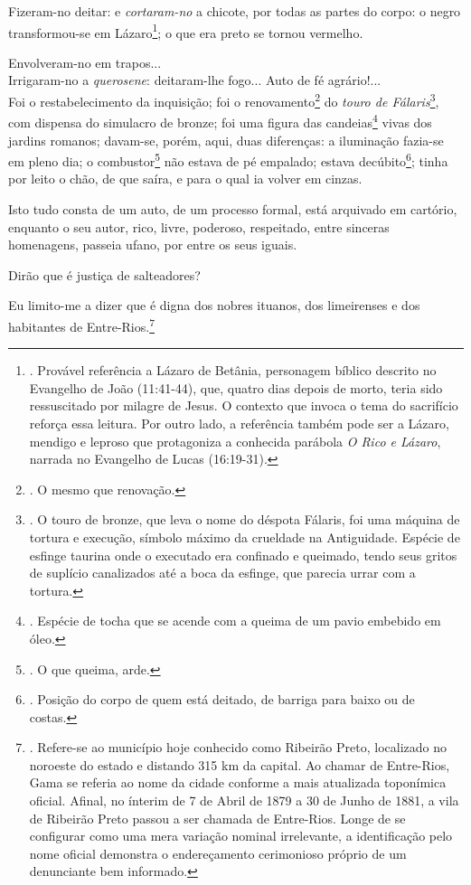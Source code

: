 Fizeram-no deitar: e \emph{cortaram-no} a chicote, por todas as partes
do corpo: o negro transformou-se em Lázaro\footnote{. Provável
  referência a Lázaro de Betânia, personagem bíblico descrito no
  Evangelho de João (11:41-44), que, quatro dias depois de morto, teria
  sido ressuscitado por milagre de Jesus. O contexto que invoca o tema
  do sacrifício reforça essa leitura. Por outro lado, a referência
  também pode ser a Lázaro, mendigo e leproso que protagoniza a
  conhecida parábola \emph{O Rico e Lázaro}, narrada no Evangelho de
  Lucas (16:19-31).}; o que era preto se tornou vermelho.

Envolveram-no em trapos...\\
Irrigaram-no a \emph{querosene}: deitaram-lhe fogo... Auto de fé
agrário!...\\
Foi o restabelecimento da inquisição; foi o renovamento\footnote{. O
  mesmo que renovação.} do \emph{touro de Fálaris}\footnote{. O touro de
  bronze, que leva o nome do déspota Fálaris, foi uma máquina de tortura
  e execução, símbolo máximo da crueldade na Antiguidade. Espécie de
  esfinge taurina onde o executado era confinado e queimado, tendo seus
  gritos de suplício canalizados até a boca da esfinge, que parecia
  urrar com a tortura.}, com dispensa do simulacro de bronze; foi uma
figura das candeias\footnote{. Espécie de tocha que se acende com a
  queima de um pavio embebido em óleo.} vivas dos jardins romanos;
davam-se, porém, aqui, duas diferenças: a iluminação fazia-se em pleno
dia; o combustor\footnote{. O que queima, arde.} não estava de pé
empalado; estava decúbito\footnote{. Posição do corpo de quem está
  deitado, de barriga para baixo ou de costas.}; tinha por leito o chão,
de que saíra, e para o qual ia volver em cinzas.

Isto tudo consta de um auto, de um processo formal, está arquivado em
cartório, enquanto o seu autor, rico, livre, poderoso, respeitado, entre
sinceras homenagens, passeia ufano, por entre os seus iguais.

Dirão que é justiça de salteadores?

Eu limito-me a dizer que é digna dos nobres ituanos, dos limeirenses e
dos habitantes de Entre-Rios.\footnote{. Refere-se ao município hoje
  conhecido como Ribeirão Preto, localizado no noroeste do estado e
  distando 315 km da capital. Ao chamar de Entre-Rios, Gama se referia
  ao nome da cidade conforme a mais atualizada toponímica oficial.
  Afinal, no ínterim de 7 de Abril de 1879 a 30 de Junho de 1881, a vila
  de Ribeirão Preto passou a ser chamada de Entre-Rios. Longe de se
  configurar como uma mera variação nominal irrelevante, a identificação
  pelo nome oficial demonstra o endereçamento cerimonioso próprio de um
  denunciante bem informado.}

